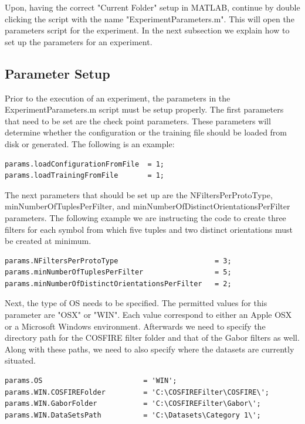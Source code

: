 Upon, having the correct "Current Folder" setup in MATLAB, continue by double clicking the script with the name "ExperimentParameters.m". This will open the parameters script for the experiment. In the next subsection we explain how to set up the parameters for an experiment.

\subsection{Parameter Setup}
Prior to the execution of an experiment, the parameters in the ExperimentParameters.m script must be setup properly. The first parameters that need to be set are the check point parameters. These parameters will determine whether the configuration or the training file should be loaded from disk or generated. The following is an example:\\

\begin{lstlisting}
params.loadConfigurationFromFile  = 1; 
params.loadTrainingFromFile       = 1;
\end{lstlisting}

The next parameters that should be set up are the NFiltersPerProtoType, minNumberOfTuplesPerFilter, and minNumberOfDistinctOrientationsPerFilter parameters. The following example we are instructing the code to create three filters for each symbol from which five tuples and two distinct orientations must be created at minimum.\\

\begin{lstlisting}
params.NFiltersPerProtoType                       = 3;
params.minNumberOfTuplesPerFilter                 = 5;
params.minNumberOfDistinctOrientationsPerFilter   = 2;
\end{lstlisting}

Next, the type of OS needs to be specified. The permitted values for this parameter are "OSX" or "WIN". Each value correspond to either an Apple OSX or a Microsoft Windows environment. Afterwards we need to specify the directory path for the COSFIRE filter folder and that of the Gabor filters as well. Along with these paths, we need to also specify where the datasets are currently situated.\\

\begin{lstlisting}
params.OS                        = 'WIN';
params.WIN.COSFIREFolder         = 'C:\COSFIREFilter\COSFIRE\';
params.WIN.GaborFolder           = 'C:\COSFIREFilter\Gabor\'; 
params.WIN.DataSetsPath          = 'C:\Datasets\Category 1\';
\end{lstlisting}

